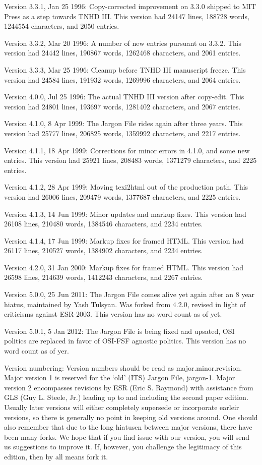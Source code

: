 Version 3.3.1, Jan 25 1996: Copy-corrected improvement on 3.3.0 shipped to MIT
Press as a step towards TNHD III. This version had 24147 lines, 188728 words,
1244554 characters, and 2050 entries.

Version 3.3.2, Mar 20 1996: A number of new entries pursuant on 3.3.2. This
version had 24442 lines, 190867 words, 1262468 characters, and 2061 entries.

Version 3.3.3, Mar 25 1996: Cleanup before TNHD III manuscript freeze. This
version had 24584 lines, 191932 words, 1269996 characters, and 2064 entries.

Version 4.0.0, Jul 25 1996: The actual TNHD III version after copy-edit. This
version had 24801 lines, 193697 words, 1281402 characters, and 2067 entries.

Version 4.1.0, 8 Apr 1999: The Jargon File rides again after three years. This
version had 25777 lines, 206825 words, 1359992 characters, and 2217 entries.

Version 4.1.1, 18 Apr 1999: Corrections for minor errors in 4.1.0, and some new
entries. This version had 25921 lines, 208483 words, 1371279 characters, and
2225 entries.

Version 4.1.2, 28 Apr 1999: Moving texi2html out of the production path. This
version had 26006 lines, 209479 words, 1377687 characters, and 2225 entries.

Version 4.1.3, 14 Jun 1999: Minor updates and markup fixes. This version had
26108 lines, 210480 words, 1384546 characters, and 2234 entries.

Version 4.1.4, 17 Jun 1999: Markup fixes for framed HTML. This version had
26117 lines, 210527 words, 1384902 characters, and 2234 entries.

Version 4.2.0, 31 Jan 2000: Markup fixes for framed HTML. This version had
26598 lines, 214639 words, 1412243 characters, and 2267 entries.

Version 5.0.0, 25 Jun 2011: The Jargon File comes alive yet again after an 8
year hiatus, maintained by Yash Tulsyan. Was forked from 4.2.0, revised in
light of criticisms against ESR-2003. This version has no word count as of yet.

Version 5.0.1, 5 Jan 2012: The Jargon File is being fixed and upsated, OSI
politics are replaced in favor of OSI-FSF agnostic politics.  This version has
no word count as of yer.

Version numbering: Version numbers should be read as major.minor.revision.
Major version 1 is reserved for the `old' (ITS) Jargon File, jargon-1. Major
version 2 encompasses revisions by ESR (Eric S. Raymond) with assistance from
GLS (Guy L. Steele, Jr.) leading up to and including the second paper edition.
Usually later versions will either completely supersede or incorporate earleir
versions, so there is generally no point in keeping old versions around. One
should also remember that due to the long hiatusen between major versions,
there have been many forks. We hope that if you find issue with our version,
you will send us suggestions to improve it. If, however, you challenge the
legitimacy of this edition, then by all means fork it.

